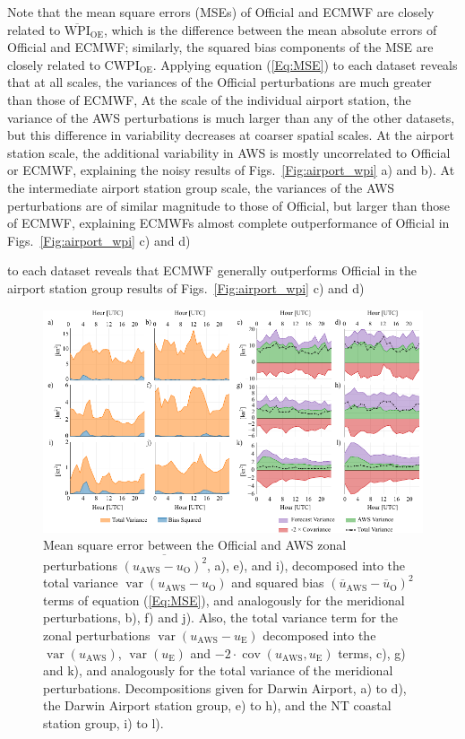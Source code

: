 \documentclass[twocol]{ametsoc}
\DeclareMathOperator{\cov}{cov}
\DeclareMathOperator{\var}{var}
\begin{document}
Note that the mean square errors (MSEs) of Official and ECMWF are closely related to $\overline{\text{WPI}}_\text{OE}$, which is the difference between the mean absolute errors of Official and ECMWF; similarly, the squared bias components of the MSE are closely related to $\text{CWPI}_\text{OE}$. Applying equation (\ref{Eq:MSE}) to each dataset reveals that at all scales, the variances of the Official perturbations are much greater than those of ECMWF, At the scale of the individual airport station, the variance of the AWS perturbations is much larger than any of the other datasets, but this difference in variability decreases at coarser spatial scales. At the airport station scale, the additional variability in AWS is mostly uncorrelated to Official or ECMWF, explaining the noisy results of Figs.~\ref{Fig:airport_wpi} a) and b). At the intermediate airport station group scale, the variances of the AWS perturbations are of similar magnitude to those of Official, but larger than those of ECMWF, explaining ECMWFs almost complete outperformance of Official in Figs.~\ref{Fig:airport_wpi} c) and d)             

to each dataset reveals that ECMWF generally outperforms Official in the airport station group results of Figs.~\ref{Fig:airport_wpi} c) and d) 


\begin{figure}
\centering
\includegraphics[width=39pc]{error_decomp_sa.pdf}
\caption{Mean square error between the Official and AWS zonal perturbations $\overline{\left(u_\text{AWS} - u_\text{O}\right)^2}$, a), e), and i), decomposed into the total variance $\var\left(u_\text{AWS} - u_\text{O}\right)$ and squared bias $\left(\overline{u}_\text{AWS} - \overline{u}_\text{O}\right)^2$ terms of equation (\ref{Eq:MSE}), and analogously for the meridional perturbations, b), f) and j). Also, the total variance term for the zonal perturbations $\var\left(u_\text{AWS} - u_\text{E}\right)$ decomposed into the $\var\left(u_\text{AWS}\right)$, $\var\left(u_\text{E}\right)$ and  $- 2 \cdot \cov\left(u_\text{AWS}, u_\text{E}\right)$ terms, c), g) and k), and analogously for the total variance of the meridional perturbations. Decompositions given for Darwin Airport, a) to d), the Darwin Airport station group, e) to h), and the NT coastal station group, i) to l).}
\label{Fig:error_decomp_sa}
\end{figure}
\end{document}

